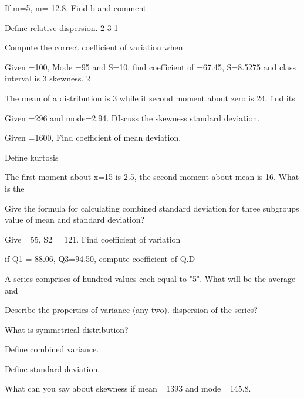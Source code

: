 \documentclass[11pt,a4paper]{article}
\begin{document}
\begin{shortlist}
\item If m=5, m=-12.8. Find b and comment

\item Define relative dispersion. 2 3 1

\item Compute the correct coefficient of variation when

\item Given =100, Mode =95 and S=10, find coefficient of =67.45, S=8.5275 and class interval is 3 skewness. 2

\item The mean of a distribution is 3 while it second moment about zero is 24, find its

\item Given =296 and mode=2.94. DIscuss the skewness standard deviation.

\item Given =1600, Find coefficient of mean deviation.

\item Define kurtosis

\item The first moment about x=15 is 2.5, the second moment about mean is 16. What is the

\item Give the formula for calculating combined standard deviation for three subgroups value of mean and standard deviation?

\item Give =55, S2 = 121. Find coefficient of variation

\item if Q1 = 88.06, Q3=94.50, compute coefficient of Q.D

\item A series comprises of hundred values each equal to "5". What will be the average and

\item Describe the properties of variance (any two). dispersion of the series?

\item What is symmetrical distribution?

\item Define combined variance.

\item Define standard deviation.

\item What can you say about skewness if mean =1393 and mode =145.8.


\end{shortlist}
\end{document}
